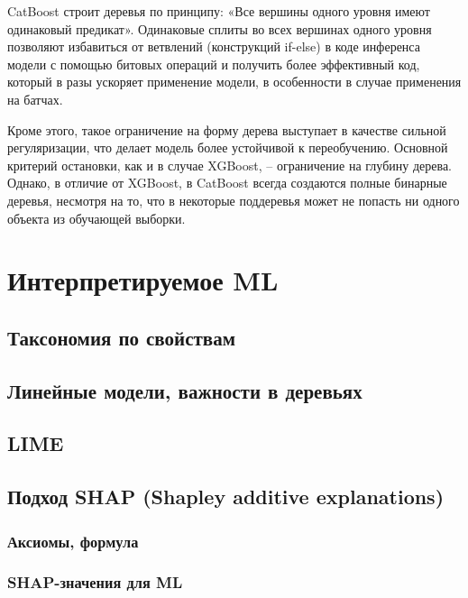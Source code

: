 \documentclass[a4paper, 14pt]{article}
\begin{document}
    CatBoost строит деревья по принципу: «Все вершины одного уровня имеют одинаковый предикат».
    Одинаковые сплиты во всех вершинах одного уровня позволяют избавиться от ветвлений (конструкций if-else) в коде
    инференса модели с помощью битовых операций и получить более эффективный код, который в разы ускоряет применение
    модели, в особенности в случае применения на батчах.
    
    Кроме этого, такое ограничение на форму дерева выступает в качестве сильной регуляризации, что делает модель более
    устойчивой к переобучению.
    Основной критерий остановки, как и в случае XGBoost, -- ограничение на глубину дерева.
    Однако, в отличие от XGBoost, в CatBoost всегда создаются полные бинарные деревья, несмотря на то, что в некоторые
    поддеревья может не попасть ни одного объекта из обучающей выборки.
    
    \section{Интерпретируемое ML}
    
    \subsection{Таксономия по свойствам}
    
    \subsection{Линейные модели, важности в деревьях}
    
    \subsection{LIME}
    
    \subsection{Подход SHAP (Shapley additive explanations)}
    
    \subsubsection{Аксиомы, формула}
    
    \subsubsection{SHAP-значения для ML}
    
\end{document}
